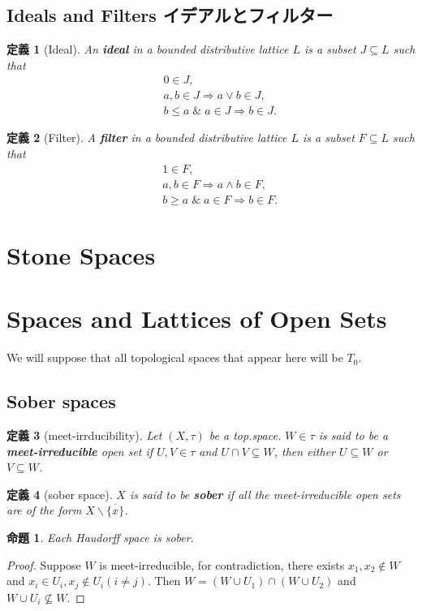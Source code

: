 \documentclass[a4j,12pt]{jarticle}
\numberwithin{equation}{section}
\newcommand{\itbf}[1]{\textit{\textbf{#1}}}
\newtheorem{dfn}{定義}[section]
\newtheorem{prop}[thm]{命題}
\begin{document}
\subsection{Ideals and Filters イデアルとフィルター}
\begin{dfn}[Ideal]
  An \itbf{ideal} in a bounded distributive lattice $L$ is a subset $J \subseteq L$ such that
  \begin{eqnarray}
    \label{eq:ideal}
    && 0 \in J,\\
    && a,b \in J \Rightarrow a \vee b \in J,\\
    && b\le a \;\&\; a \in J \Rightarrow b \in J.
  \end{eqnarray}
\end{dfn}
\begin{dfn}[Filter]
  A \itbf{filter} in a bounded distributive lattice $L$ is a subset $F \subseteq L$ such that
  \begin{eqnarray}
    \label{eq:filter}
    && 1 \in F,\\
    && a,b \in F \Rightarrow a \wedge b \in F,\\
    && b \ge a \;\&\; a \in F \Rightarrow b \in F.
  \end{eqnarray}
\end{dfn}
\section{Stone Spaces}
\section{Spaces and Lattices of Open Sets}
We will suppose that all topological spaces that appear here will be $T_0$.
\subsection{Sober spaces}
\begin{dfn}[meet-irrducibility]
  Let $(X,\tau)$ be a top.space. $W\in \tau$ is said to be a \itbf{meet-irreducible} open set if $U,V\in \tau$ and $U \cap V \subseteq W$, then either $U \subseteq W$ or $V \subseteq W$.
\end{dfn}
\begin{dfn}[sober space]
  $X$ is said to be \itbf{sober} if all the meet-irreducible open sets are of the form $X\backslash \overline{\{x\}}$.
\end{dfn}
\begin{prop}
  Each Haudorff space is sober.
\end{prop}
\begin{proof}
  Suppose $W$ is meet-irreducible, for contradiction, there exists $x_1,x_2\notin W$ and $x_i \in U_i, x_j \notin U_i(i \ne j)$.
  Then $W = (W \cup U_1) \cap (W \cup U_2)$ and $W\cup U_i \nsubseteq W$.
\end{proof}
\end{document}
